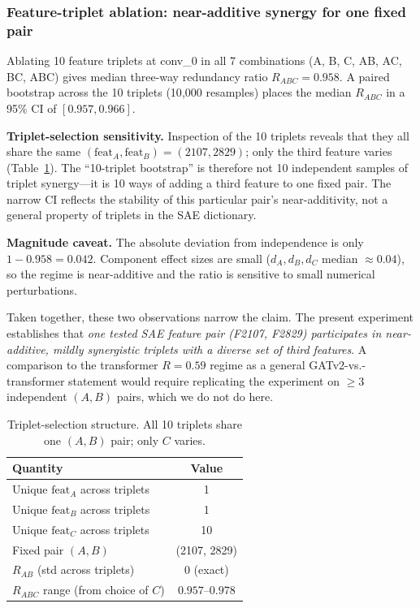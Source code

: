 \documentclass[11pt]{article}
\begin{document}
\subsubsection{Feature-triplet ablation: near-additive synergy for one fixed pair}
\label{sec:synergy}

Ablating 10 feature triplets at conv\_0 in all 7 combinations (A, B, C,
AB, AC, BC, ABC) gives median three-way redundancy ratio
$R_{ABC} = 0.958$. A paired bootstrap across the 10 triplets
(10{,}000 resamples) places the median $R_{ABC}$ in a 95\% CI of
$[0.957, 0.966]$.

\textbf{Triplet-selection sensitivity.} Inspection of the 10
triplets reveals that they all share the same
$(\text{feat}_A, \text{feat}_B) = (2107, 2829)$; only the third feature
varies (Table~\ref{tab:synergy_sensitivity}). The ``10-triplet
bootstrap'' is therefore not 10 independent samples of triplet
synergy---it is 10 ways of adding a third feature to one fixed pair.
The narrow CI reflects the stability of this particular pair's
near-additivity, not a general property of triplets in the SAE
dictionary.

\textbf{Magnitude caveat.} The absolute deviation from
independence is only $1 - 0.958 = 0.042$. Component effect sizes are
small ($d_A, d_B, d_C$ median $\approx 0.04$), so the regime is
near-additive and the ratio is sensitive to small numerical
perturbations.

Taken together, these two observations narrow the claim. The present
experiment establishes that \emph{one tested SAE feature pair (F2107,
F2829) participates in near-additive, mildly synergistic triplets
with a diverse set of third features}. A comparison to the
transformer $R = 0.59$ regime as a general GATv2-vs.-transformer
statement would require replicating the experiment on $\geq 3$
independent $(A, B)$ pairs, which we do not do here.

\begin{table}[ht]
\centering
\caption{Triplet-selection structure. All 10 triplets share one
$(A, B)$ pair; only $C$ varies.}
\label{tab:synergy_sensitivity}
\small
\begin{tabular}{lc}
\toprule
Quantity & Value \\
\midrule
Unique $\text{feat}_A$ across triplets & 1 \\
Unique $\text{feat}_B$ across triplets & 1 \\
Unique $\text{feat}_C$ across triplets & 10 \\
Fixed pair $(A, B)$ & (2107, 2829) \\
$R_{AB}$ (std across triplets) & 0 (exact) \\
$R_{ABC}$ range (from choice of $C$) & $0.957$--$0.978$ \\
\bottomrule
\end{tabular}
\end{table}
\end{document}
